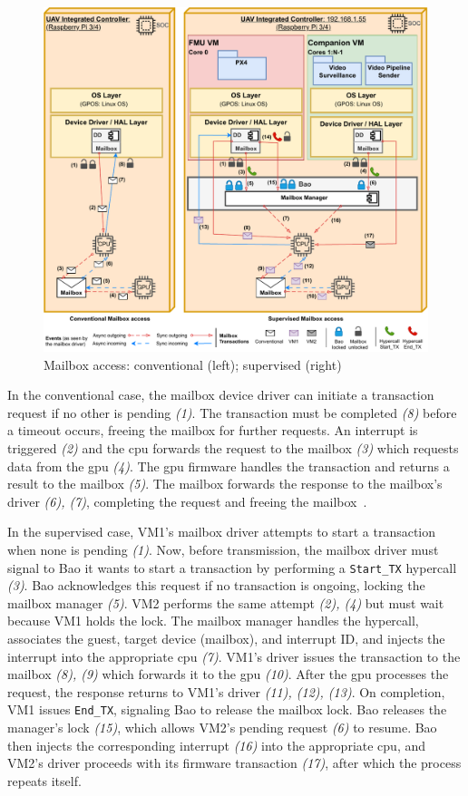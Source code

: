 \begin{figure}[!hbtp]
  \centering
  \includegraphics[width=1.0\textwidth]{./img/pdf/uav-main-design-mailbox}
  \caption{Mailbox access: conventional (left); supervised (right)}%
  \label{fig:design-mailbox}
\end{figure}


In the conventional case, the mailbox device driver can initiate a transaction
request if no other is pending \emph{(1)}. The transaction must
be completed \emph{(8)} before a timeout occurs, freeing the mailbox for further
requests. An interrupt is triggered \emph{(2)} and the \gls{cpu} forwards the request
to the mailbox \emph{(3)} which requests data from the \gls{gpu} \emph{(4)}. The \gls{gpu}
firmware handles the transaction and returns a result to the mailbox \emph{(5)}. The
mailbox forwards the response to the mailbox's driver \emph{(6), (7)}, completing
the request and freeing the mailbox~\cite{rpi4-mbox-driver}.

In the supervised case, VM1's mailbox driver attempts to start a
transaction when none is pending \emph{(1)}. Now,
before transmission, the mailbox driver must signal to Bao it wants
to start a transaction by performing a \lstinline{Start_TX} hypercall \emph{(3)}. Bao
acknowledges this request if no transaction is ongoing, locking the
mailbox manager \emph{(5)}.
VM2 performs the same attempt \emph{(2), (4)} but must wait because VM1 holds the lock.
%
The mailbox manager handles the hypercall,
associates the guest, target device (mailbox), and interrupt ID, and injects the
interrupt into the appropriate \gls{cpu} \emph{(7)}.
%
VM1's driver issues the transaction to the mailbox \emph{(8), (9)} which
forwards it to the \gls{gpu} \emph{(10)}.
%
After the \gls{gpu} processes the request, the response returns to VM1's
driver \emph{(11), (12), (13)}. On completion, VM1 issues \lstinline{End_TX}, signaling Bao
to release the mailbox lock. Bao releases the manager's lock \emph{(15)}, which allows
VM2's pending request \emph{(6)} to resume. Bao then injects the corresponding
interrupt \emph{(16)} into the appropriate \gls{cpu}, and VM2's driver proceeds with
its firmware transaction \emph{(17)}, after which the process repeats itself.

